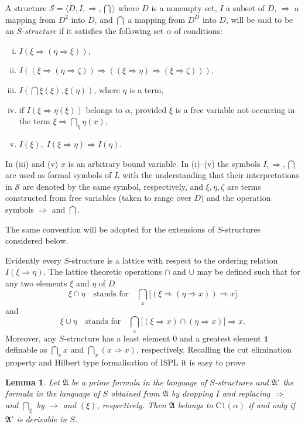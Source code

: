 \documentclass[12pt,a4paper]{article}
\newtheorem{lemma}{Lemma}
\begin{document}
A structure $\mathscr{S} = \langle D, I, \Rightarrow, \bigcap\rangle$ where
$D$ is a nonempty set, $I$ a subset of $D$, $\Rightarrow$ a mapping from
$D^2$ into $D$, and $\bigcap$ a mapping from $D^D$ into $D$, will be said to
be an \emph{$S$-structure} if it satisfies the following set $\alpha$ of
conditions:
\begin{enumerate}[(i)]
\item $I(\xi \Rightarrow (\eta \Rightarrow \xi))$,
\item $I((\xi \Rightarrow (\eta \Rightarrow \zeta)) \Rightarrow
    ((\xi \Rightarrow \eta) \Rightarrow (\xi \Rightarrow \zeta)))$,
\item $I(\bigcap \xi(\xi), \xi(\eta))$, where $\eta$ is a term,
\item if $I(\xi \Rightarrow \eta(\xi))$ belongs to $\alpha$, provided $\xi$
  is a free variable not occurring in the term
  $\xi \Rightarrow \bigcap_\eta \eta(x)$,
\item $I(\xi),\; I(\xi \Rightarrow \eta) \Rightarrow I(\eta)$.
\end{enumerate}
In (iii) and (v) $x$ is an arbitrary bound variable. In (i)--(v) the symbols
$I, \Rightarrow, \bigcap$ are used as formal symbols of $L$ with the
understanding that their interpretations in $\mathscr{S}$ are denoted by the
same symbol, respectively, and $\xi, \eta, \zeta$ are terms constructed from
free variables (taken to range over $D$) and the operation symbols $\Rightarrow$
and $\bigcap$.

The same convention will be adopted for the extensions of $S$-structures
considered below.

Evidently every $S$-structure is a lattice with respect to the ordering
relation $I(\xi \Rightarrow \eta)$. The lattice theoretic operations $\cap$
and $\cup$ may be defined such that for any two elements $\xi$ and $\eta$ of
$D$
\[
\xi \cap \eta \quad\text{stands for}\quad
\bigcap_{x} \bigl[(\xi \Rightarrow (\eta \Rightarrow x)) \Rightarrow x\bigr]
\]
and
\[
\xi \cup \eta \quad\text{stands for}\quad
\bigcap_{x} \bigl[(\xi \Rightarrow x) \cap (\eta \Rightarrow x)\bigr]
  \Rightarrow x.
\]
Moreover, any $S$-structure has a least element $0$ and a greatest element
$\mathbf{1}$ definable as $\bigcap_x x$ and $\bigcap_x (x \Rightarrow x)$,
respectively. Recalling the cut elimination property and Hilbert type
formalisation of ISPL it is easy to prove

\begin{lemma}
Let $\mathfrak{A}$ be a prime formula in the language of $S$-structures and
$\mathfrak{A}'$ the formula in the language of $S$ obtained from $\mathfrak{A}$
by dropping $I$ and replacing $\Rightarrow$ and $\bigcap_\xi$ by $\to$ and
$(\xi)$, respectively. Then $\mathfrak{A}$ belongs to $\mathrm{C1}(\alpha)$
if and only if $\mathfrak{A}'$ is derivable in $S$.
\end{lemma}
\end{document}
